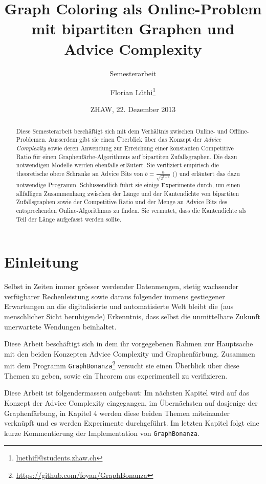 \documentclass[11pt,abstracton]{scrreprt} %
\title{Graph Coloring als Online-Problem mit bipartiten Graphen und Advice Complexity}
\subtitle{Semesterarbeit}
\author{Florian Lüthi\footnote{\url{luethifl@students.zhaw.ch}}}
\date{ZHAW, 22. Dezember 2013} %
\theoremstyle{definition}
\begin{document}
\maketitle

\begin{abstract}
Diese Semesterarbeit beschäftigt sich mit dem Verhältnis zwischen Online- und Offline-Problemen. Ausserdem gibt sie einen Überblick über das Konzept der {\sl Advice Complexity} sowie deren Anwendung zur Erreichung einer konstanten Competitive Ratio für einen Graphenfärbe-Algorithmus auf bipartiten Zufallsgraphen. Die dazu notwendigen Modelle werden ebenfalls erläutert. Sie verifiziert empirisch die theoretische obere Schranke an Advice Bits von $b = \frac n {\sqrt{ 2 ^ {k-1 }}}$ (\cite{bipartite}) und erläutert das dazu notwendige Programm. Schlussendlich führt sie einige Experimente durch, um einen allfälligen Zusammenhang zwischen der Länge und der Kantendichte von bipartiten Zufallsgraphen sowie der Competitive Ratio und der Menge an Advice Bits des entsprechenden Online-Algorithmus zu finden. Sie vermutet, dass die Kantendichte als Teil der Länge aufgefasst werden sollte.
\end{abstract}

\tableofcontents

\chapter{Einleitung}

Selbst in Zeiten immer grösser werdender Datenmengen, stetig wachsender verfügbarer Rechenleistung sowie daraus folgender immens gestiegener Erwartungen an die digitalisierte und automatisierte Welt bleibt die (aus menschlicher Sicht beruhigende) Erkenntnis, dass selbst die unmittelbare Zukunft unerwartete Wendungen beinhaltet.

\bigskip

Diese Arbeit beschäftigt sich in dem ihr vorgegebenen Rahmen zur Hauptsache mit den beiden Konzepten Advice Complexity und Graphenfärbung. Zusammen mit dem Programm {\tt GraphBonanza}\footnote{\url{https://github.com/foyan/GraphBonanza}} versucht sie einen Überblick über diese Themen zu geben, sowie ein Theorem aus \cite{bipartite} experimentell zu verifizieren.

Diese Arbeit ist folgendermassen aufgebaut: Im nächsten Kapitel wird auf das Konzept der Advice Complexity eingegangen, im Übernächsten auf dasjenige der Graphenfärbung, in Kapitel 4 werden diese beiden Themen miteinander verknüpft und es werden Experimente durchgeführt. Im letzten Kapitel folgt eine kurze Kommentierung der Implementation von {\tt GraphBonanza}.
\end{document}

